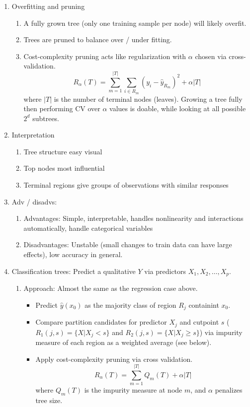 \documentclass{article}
\begin{document}
\begin{enumerate}
\item Overfitting and pruning
\begin{enumerate}
\item A fully grown tree (only one training sample per node) will likely overfit. 
\item Trees are pruned to balance over / under fitting.
\item Cost-complexity pruning acts like regularization with $\alpha$ chosen via cross-validation.
\[
R_{\alpha}(T) = \sum_{m=1}^{|T|} \sum_{i \in R_m} (y_i - \hat{y}_{R_m})^2 + \alpha|T|
\]
where $|T|$ is the number of terminal nodes (leaves). Growing a tree fully then performing CV over $\alpha$ values is doable, while looking at all possible $2^{d}$ subtrees.
\end{enumerate}

\item Interpretation
\begin{enumerate}
\item Tree structure easy visual
\item Top nodes most influential
\item Terminal regions give groups of observations with similar responses
\end{enumerate}

\item Adv / disadvs:
\begin{enumerate}
\item Advantages: Simple, interpretable, handles nonlinearity and interactions automatically, handle categorical variables	
\item Disadvantages: Unstable (small changes to train data can have large effects), low accuracy in general.
\end{enumerate}

\item Classification trees: Predict a qualitative $Y$ via predictors $X_1, X_2, \dots, X_p$.
\begin{enumerate}
\item Approach: Almost the same as the regression case above.
\begin{itemize}
\item Predict $\hat{y}(x_0)$ as the majority class of region $R_j$ containint $x_0$.
\item Compare partition candidates for predictor $X_j$ and cutpoint $s$ ($R_1(j,s) = \{X | X_j < s\}$ and $R_2(j,s) = \{X | X_j \geq s\}$) via impurity measure of each region as a weighted average (see below).
\item Apply cost-complexity pruning via cross validation.
\[
R_{\alpha}(T) = \sum_{m=1}^{|T|} Q_m(T) + \alpha|T|
\]
where $Q_m(T)$ is the impurity measure at node $m$, and $\alpha$ penalizes tree size.
\end{itemize}


\end{enumerate}
\end{enumerate}
\end{document}
